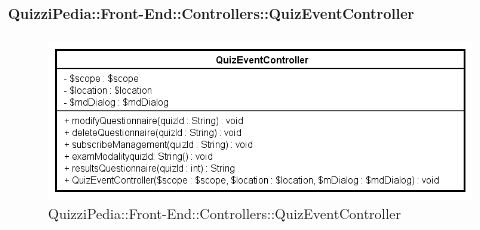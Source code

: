 \paragraph{QuizziPedia::Front-End::Controllers::QuizEventController}
\begin{figure} [ht]
	\centering
	\includegraphics[scale=0.80]{UML/Classi/Front-End/QuizziPedia_Front-end_Controller_QuizEventController.png}
	\caption{QuizziPedia::Front-End::Controllers::QuizEventController}
\end{figure} \FloatBarrier
